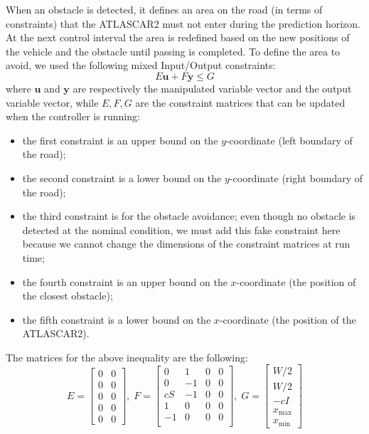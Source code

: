 \documentclass[conference, 11pt]{IEEEtran}
\begin{document}
When an obstacle is detected, it defines an area on the road (in terms of constraints) that the ATLASCAR2 must not enter during the prediction horizon. At the next control interval the area is redefined based on the new positions of the vehicle and the obstacle until passing is completed.
To define the area to avoid, we used the following mixed Input/Output constraints:
\begin{equation*}
	\label{eqn:mixed_IO_constraints}
	E\textbf{u}+F\textbf{y}\leq G
\end{equation*}
where $\textbf{u}$ and $\textbf{y}$ are respectively the manipulated variable vector and the output variable vector, while $E,F,G$ are the constraint matrices that can be updated when the controller is running:
\begin{itemize}
	\item the first constraint is an upper bound on the $y$-coordinate (left boundary of the road);
	\item the second constraint is a lower bound on the $y$-coordinate (right boundary of the road);
	\item the third constraint is for the obstacle avoidance; even though no obstacle is detected at the nominal condition, we must add this fake constraint here because we cannot change the dimensions of the constraint matrices at run time;
	\item the fourth constraint is an upper bound on the $x$-coordinate (the position of the closest obstacle);
	\item the fifth constraint is a lower bound on the $x$-coordinate (the position of the ATLASCAR2).
\end{itemize}
The matrices for the above inequality are the following:
\[
E= 
\begin{bmatrix}
0&0\\
0&0\\
0&0\\
0&0\\
0&0
\end{bmatrix},
\;
F=\begin{bmatrix}
0&1&0&0\\
0&-1&0&0\\
cS&-1&0&0\\
1&0&0&0\\
-1&0&0&0\\
\end{bmatrix},\;
G=
\begin{bmatrix}
W/2\\W/2\\-cI\\x_{\max}\\x_{\min}
\end{bmatrix}
\]
\end{document}

